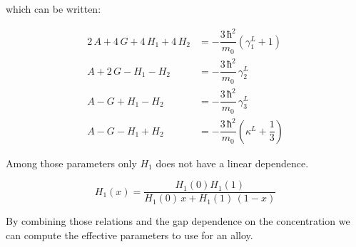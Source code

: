 \documentclass[prb,aps]{revtex4}
\begin{document}
        which can be written:

        \begin{align}
            2\,A + 4\,G + 4\,H_1 + 4\,H_2 &= -\dfrac{3\,ħ^2}{m_0} \left( γ_1^L + 1 \right)\\
            A + 2\,G - H_1 - H_2 &= - \dfrac{3\,ħ^2}{m_0}\,γ_2^L\\
            A - G + H_1 - H_2 &= - \dfrac{3\,ħ^2}{m_0}\,γ_3^L\\
            A - G - H_1 + H_2 &= - \dfrac{3\,ħ^2}{m_0}\left( κ^L + \dfrac{1}{3} \right)
        \end{align}

        Among those parameters only $H_1$ does not have a linear dependence.

        \begin{equation}
            H_1(x) = \dfrac{H_1(0)H_1(1)}{H_1(0)\,x + H_1(1)\,(1-x)}
        \end{equation}

        By combining those relations and the gap dependence on the concentration we can compute the effective parameters to use for an alloy.
\end{document}
